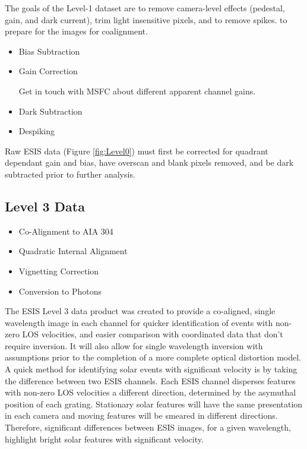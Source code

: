         The goals of the Level-1 dataset are to remove camera-level effects (pedestal, gain, and dark current), trim light insensitive pixels, and to remove spikes. to prepare for the images for coalignment.
    
        \begin{itemize}
            \item Bias Subtraction
            \item Gain Correction
         
            
                 Get in touch with MSFC about different apparent channel gains.
            \item Dark Subtraction
            \item Despiking
        \end{itemize}
       Raw ESIS data (Figure \ref{fig:Level0}) must first be corrected for quadrant dependant gain and bias, have overscan and blank pixels removed, and be dark subtracted prior to further analysis.
       
	       


    \subsection{Level 3 Data}
        \begin{itemize}
            \item Co-Alignment to AIA 304
            \item Quadratic Internal Alignment
            \item Vignetting Correction
            \item Conversion to Photons
        \end{itemize}
        
        The ESIS Level 3 data product was created to provide a co-aligned, single wavelength image in each channel for quicker identification of events with non-zero LOS velocities, and easier comparison with coordinated data that don't require inversion. 
        It will also allow for single wavelength inversion with assumptions prior to the completion of a more complete optical distortion model. 
        A quick method for identifying solar events with significant velocity is by taking the difference between two ESIS channels.
        Each ESIS channel disperses features with non-zero LOS velocities a different direction, determined by the asymuthal position of each grating. 
        Stationary solar features will have the same presentation in each camera and moving features will be smeared in different directions.
        Therefore, significant differences between ESIS images, for a given wavelength, highlight bright solar features with significant velocity.
        
